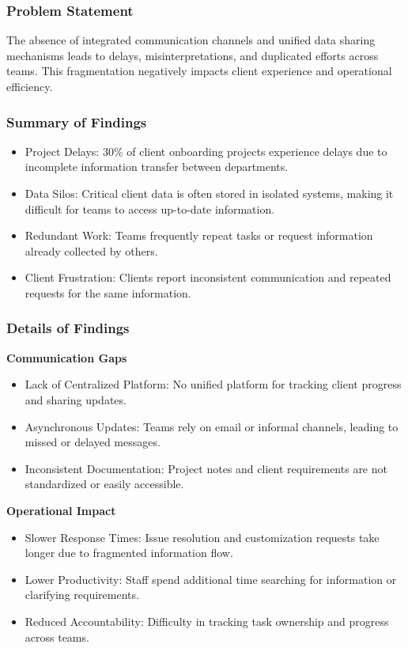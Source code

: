 \subsubsection*{Problem Statement}
The absence of integrated communication channels and unified data sharing mechanisms leads to delays, misinterpretations, and duplicated efforts across teams. This fragmentation negatively impacts client experience and operational efficiency.

\subsubsection*{Summary of Findings}
\begin{itemize}
    \item Project Delays: 30\% of client onboarding projects experience delays due to incomplete information transfer between departments.
    \item Data Silos: Critical client data is often stored in isolated systems, making it difficult for teams to access up-to-date information.
    \item Redundant Work: Teams frequently repeat tasks or request information already collected by others.
    \item Client Frustration: Clients report inconsistent communication and repeated requests for the same information.
\end{itemize}

\subsubsection*{Details of Findings}
\textbf{Communication Gaps}
\begin{itemize}
    \item Lack of Centralized Platform: No unified platform for tracking client progress and sharing updates.
    \item Asynchronous Updates: Teams rely on email or informal channels, leading to missed or delayed messages.
    \item Inconsistent Documentation: Project notes and client requirements are not standardized or easily accessible.
\end{itemize}
\textbf{Operational Impact}
\begin{itemize}
    \item Slower Response Times: Issue resolution and customization requests take longer due to fragmented information flow.
    \item Lower Productivity: Staff spend additional time searching for information or clarifying requirements.
    \item Reduced Accountability: Difficulty in tracking task ownership and progress across teams.
\end{itemize}

